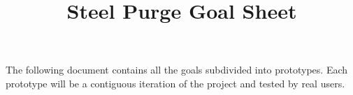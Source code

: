 \documentclass[12pt]{article}
\title{Steel Purge Goal Sheet}
\begin{document}
\maketitle{}

The following document contains all the goals subdivided into prototypes. Each prototype will be a contiguous iteration of the project and tested by real users. 


\end{document}
